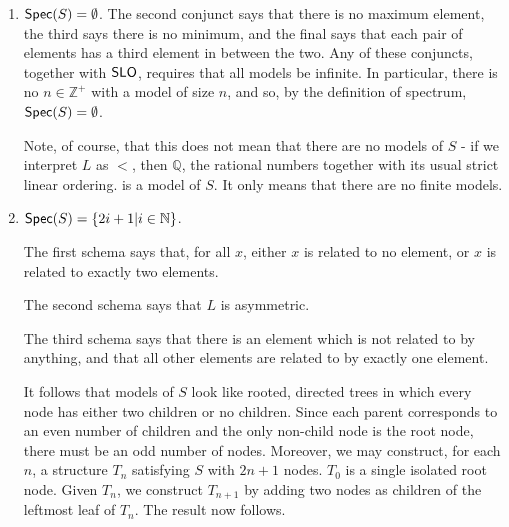 \begin{mdframed}[linewidth=1]
\begin{enumerate}
    \item $\mbox{$\mathsf{Spec}(S)$} = \emptyset$. The second conjunct says that there is no maximum element, the third says there is no minimum, and the final says that each pair of elements has a third element in between the two. Any of these conjuncts, together with $\mbox{$\mathsf{SLO}$}$, requires that all models be infinite. In particular, there is no $n \in \mathbb{Z}^+$ with a model of size $n$, and so, by the definition of spectrum, $\mbox{$\mathsf{Spec}(S)$} = \emptyset$. 

   Note, of course, that this does not mean that there are no models of $S$ - if we interpret $L$ as $<$, then $\mathbb{Q}$, the rational numbers together with its usual strict linear ordering. is a model of $S$. It only means that there are no finite models. 

    \item $\mbox{$\mathsf{Spec}(S)$} = \{2i + 1 | i \in \mathbb{N}\}$. 

   The first schema says that, for all $x$, either $x$ is related to no element, or $x$ is related to exactly two elements. 

   The second schema says that $L$ is asymmetric. 

   The third schema says that there is an element which is not related to by anything, and that all other elements are related to by exactly one element.

   It follows that models of $S$ look like rooted, directed trees in which every node has either two children or no children. Since each parent corresponds to an even number of children and the only non-child node is the root node, there must be an odd number of nodes. Moreover, we may construct, for each $n$, a structure $T_n$ satisfying $S$ with $2n+1$ nodes. $T_0$ is a single isolated root node. Given $T_n$, we construct $T_{n+1}$ by adding two nodes as children of the leftmost leaf of $T_n$. The result now follows. 
   
\end{enumerate}
\end{mdframed}